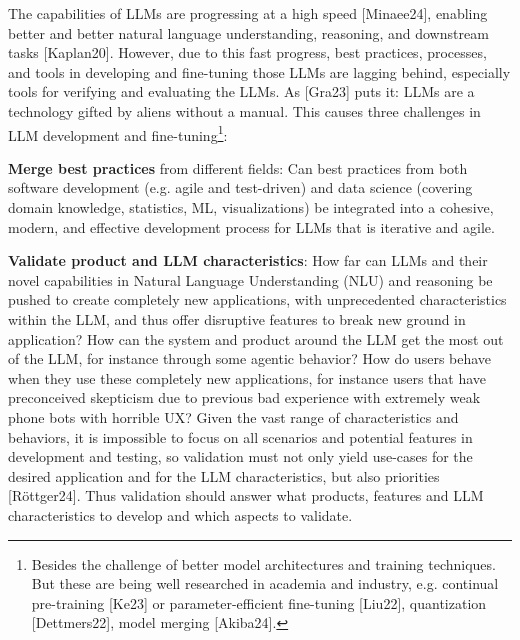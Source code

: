 \documentclass[twocolumn]{article}
\begin{document}
The capabilities of LLMs are progressing at a high speed [Minaee24],
enabling better and better natural language understanding, reasoning, and downstream tasks [Kaplan20].
However, due to this fast progress, best practices, processes, and tools in developing and fine-tuning those LLMs are lagging behind,
especially tools for verifying and evaluating the LLMs.
As [Gra23] puts it: LLMs are a technology gifted by aliens without a manual.
This causes three challenges in LLM development and fine-tuning\footnote{Besides the challenge of better model architectures and training techniques. But these are being well researched in academia and industry, e.g. continual pre-training [Ke23] or parameter-efficient fine-tuning [Liu22], quantization [Dettmers22], model merging [Akiba24].}:
\begin{compactenum}
\item {\bfseries Merge best practices} from different fields: Can best practices from both software development (e.g. agile and test-driven) and data science (covering domain knowledge, statistics, ML, visualizations) be integrated into a cohesive, modern, and effective development process for LLMs that is iterative and agile.
\item {\bfseries Validate product and LLM characteristics}: How far can LLMs and their novel capabilities in Natural Language Understanding (NLU) and reasoning be pushed to create
completely new applications, with unprecedented characteristics within the LLM, and thus offer disruptive features to break new ground in application? How can the system and product around the LLM get the most out of the LLM, for instance through some agentic behavior? How do users behave when they use these completely new applications, for instance users that have preconceived skepticism due to previous bad experience with extremely weak phone bots with horrible UX? Given the vast range of characteristics and behaviors, it is impossible to focus on all scenarios and potential features in development and testing, so validation must not only yield use-cases for the desired application and for the LLM characteristics, but also priorities [Röttger24]. Thus validation should answer what products, features and LLM characteristics to develop and which aspects to validate.

\end{compactenum}
\end{document}
